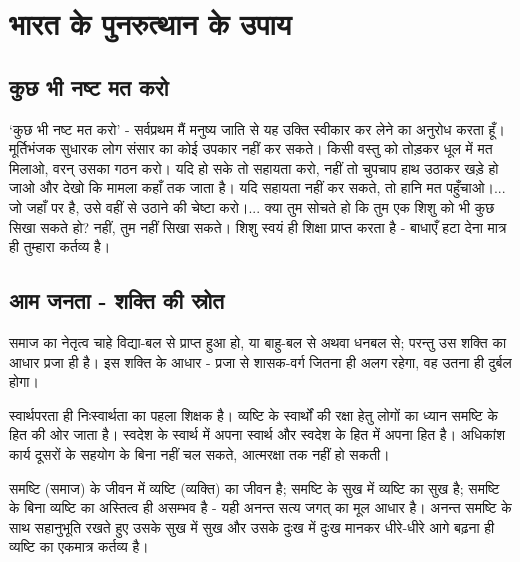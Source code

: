 
\chapter{भारत के पुनरुत्थान के उपाय }

\indentsecionsintoc



\section*{कुछ भी नष्ट मत करो}


‘कुछ भी नष्ट मत करो’ - सर्वप्रथम मैं मनुष्य जाति से यह उक्ति स्वीकार कर लेने का अनुरोध करता हूँ। मूर्तिभंजक सुधारक लोग संसार का कोई उपकार नहीं कर सकते। किसी वस्तु को तोड़कर धूल में मत मिलाओ, वरन् उसका गठन करो। यदि हो सके तो सहायता करो, नहीं तो चुपचाप हाथ उठाकर खड़े हो जाओ और देखो कि मामला कहाँ तक जाता है। यदि सहायता नहीं कर सकते, तो हानि मत पहुँचाओ।... जो जहाँ पर है, उसे वहीं से उठाने की चेष्टा करो।... क्या तुम सोचते हो कि तुम एक शिशु को भी कुछ सिखा सकते हो? नहीं, तुम नहीं सिखा सकते। शिशु स्वयं ही शिक्षा प्राप्त करता है - बाधाएँ हटा देना मात्र ही तुम्हारा कर्तव्य है।


\section*{आम जनता - शक्ति की स्रोत}


समाज का नेतृत्व चाहे विद्या-बल से प्राप्त हुआ हो, या बाहु-बल से अथवा धनबल से; परन्तु उस शक्ति का आधार प्रजा ही है। इस शक्ति के आधार - प्रजा से शासक-वर्ग जितना ही अलग रहेगा, वह उतना ही दुर्बल होगा। 

स्वार्थपरता ही निःस्वार्थता का पहला शिक्षक है। व्यष्टि के स्वार्थों की रक्षा हेतु लोगों का ध्यान समष्टि के हित की ओर जाता है। स्वदेश के स्वार्थ में अपना स्वार्थ और स्वदेश के हित में अपना हित है। अधिकांश कार्य दूसरों के सहयोग के बिना नहीं चल सकते, आत्मरक्षा तक नहीं हो सकती। 

समष्टि (समाज) के जीवन में व्यष्टि (व्यक्ति) का जीवन है; समष्टि के सुख में व्यष्टि का सुख है; समष्टि के बिना व्यष्टि का अस्तित्व ही असम्भव है - यही अनन्त सत्य जगत् का मूल आधार है। अनन्त समष्टि के साथ सहानुभूति रखते हुए उसके सुख में सुख और उसके दुःख में दुःख मानकर धीरे-धीरे आगे बढ़ना ही व्यष्टि का एकमात्र कर्तव्य है।


